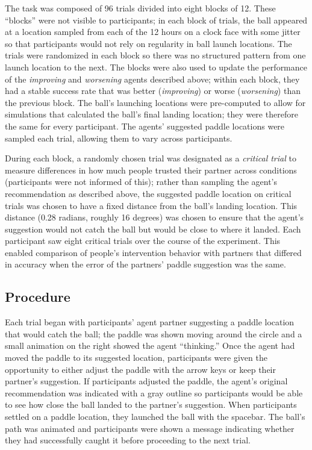 \documentclass[10pt,letterpaper]{article}
\begin{document}
The task was composed of 96 trials divided into eight blocks of 12. These ``blocks'' were not visible to participants; in each block of trials, the ball appeared at a location sampled from each of the 12 hours on a clock face with some jitter so that participants would not rely on regularity in ball launch locations. The trials were randomized in each block so there was no structured pattern from one launch location to the next. The blocks were also used to update the performance of the \textit{improving} and \textit{worsening} agents described above; within each block, they had a stable success rate that was better (\textit{improving}) or worse (\textit{worsening}) than the previous block. The ball's launching locations were pre-computed to allow for simulations that calculated the ball's final landing location; they were therefore the same for every participant. The agents' suggested paddle locations were sampled each trial, allowing them to vary across participants. 

During each block, a randomly chosen trial was designated as a \textit{critical trial} to measure differences in how much people trusted their partner across conditions (participants were not informed of this); rather than sampling the agent's recommendation as described above, the suggested paddle location on critical trials was chosen to have a fixed distance from the ball's landing location. This distance (0.28 radians, roughly 16 degrees) was chosen to ensure that the agent's suggestion would not catch the ball but would be close to where it landed. Each participant saw eight critical trials over the course of the experiment. This enabled comparison of people's intervention behavior with partners that differed in accuracy when the error of the partners' paddle suggestion was the same. 


\subsection{Procedure}

Each trial began with participants' agent partner suggesting a paddle location that would catch the ball; the paddle was shown moving around the circle and a small animation on the right showed the agent ``thinking.'' Once the agent had moved the paddle to its suggested location, participants were given the opportunity to either adjust the paddle with the arrow keys or keep their partner's suggestion. If participants adjusted the paddle, the agent's original recommendation was indicated with a gray outline so participants would be able to see how close the ball landed to the partner's suggestion. When participants settled on a paddle location, they launched the ball with the spacebar. The ball's path was animated and participants were shown a message indicating whether they had successfully caught it before proceeding to the next trial. 
\end{document}
